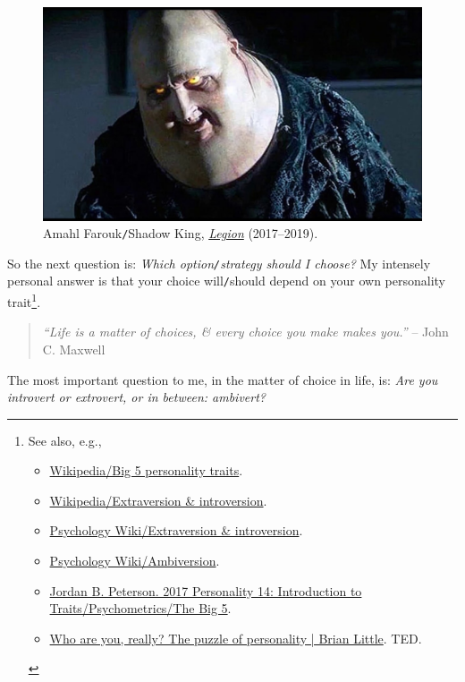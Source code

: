 \documentclass[12pt,oneside]{book}
\begin{document}
\begin{figure}[H]
	\centering
	\includegraphics[width = 12cm]{Shadow_King}
	\caption{{\sf Amahl Farouk{\tt/}Shadow King}, \href{https://www.imdb.com/title/tt5114356}{\it Legion} (2017--2019).}
	\label{fig3}
\end{figure}
So the next question is: {\it Which option{\tt/}strategy should I choose?} My intensely personal answer is that your choice will{\tt/}should depend on your own personality trait\footnote{See also, e.g.,
	\begin{itemize}
		\item \href{https://en.wikipedia.org/wiki/Big_Five_personality_traits}{Wikipedia/Big 5 personality traits}.
		\item \href{https://en.wikipedia.org/wiki/Extraversion_and_introversion}{Wikipedia/Extraversion \& introversion}.
		\item \href{https://psychology.wikia.org/wiki/Extraversion_and_introversion}{Psychology Wiki/Extraversion \& introversion}.
		\item \href{https://psychology.wikia.org/wiki/Ambiversion}{Psychology Wiki/Ambiversion}.
		\item \href{https://www.youtube.com/watch?v=pCceO_D4AlY}{Jordan B. Peterson. 2017 Personality 14: Introduction to Traits/Psychometrics/The Big 5}.
		\item \href{https://www.youtube.com/watch?v=qYvXk_bqlBk}{Who are you, really? The puzzle of personality | Brian Little}. TED.
\end{itemize}}.
\begin{quotation}
	{\it``Life is a matter of choices, \& every choice you make makes you.''} -- {\sc John C. Maxwell}
\end{quotation}
The most important question to me, in the matter of choice in life, is: {\it Are you introvert or extrovert, or in between: ambivert?}
\end{document}
